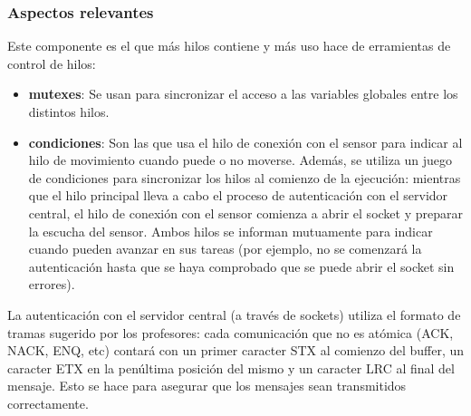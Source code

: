 \documentclass[a4paper,12pt]{article}
\begin{document}
\subsubsection{Aspectos relevantes}
Este componente es el que más hilos contiene y más uso hace de erramientas de control de hilos:
\begin{itemize}
  \item \textbf{mutexes}: Se usan para sincronizar el acceso a las variables globales entre los distintos hilos.
  \item \textbf{condiciones}: Son las que usa el hilo de conexión con el sensor para indicar al hilo de movimiento cuando puede o no moverse.
        Además, se utiliza un juego de condiciones para sincronizar los hilos al comienzo de la ejecución: mientras que el hilo principal lleva a cabo
        el proceso de autenticación con el servidor central, el hilo de conexión con el sensor comienza a abrir el socket y preparar la escucha del sensor.
        Ambos hilos se informan mutuamente para indicar cuando pueden avanzar en sus tareas (por ejemplo, no se comenzará la autenticación hasta que se haya
        comprobado que se puede abrir el socket sin errores).
\end{itemize}
La autenticación con el servidor central (a través de sockets) utiliza el formato de tramas sugerido por los profesores: cada comunicación
que no es atómica (ACK, NACK, ENQ, etc) contará con un primer caracter STX al comienzo del buffer, un caracter ETX en la penúltima posición
del mismo y un caracter LRC al final del mensaje. Esto se hace para asegurar que los mensajes sean transmitidos correctamente. \par
\end{document}
